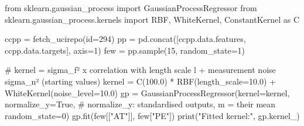 \documentclass[
  letterpaper,
  DIV=11,
  numbers=noendperiod]{scrreprt}
\newenvironment{Shaded}{\begin{snugshade}}{\end{snugshade}}
\newcommand{\BuiltInTok}[1]{\textcolor[rgb]{0.00,0.23,0.31}{#1}}
\newcommand{\CommentTok}[1]{\textcolor[rgb]{0.37,0.37,0.37}{#1}}
\newcommand{\DecValTok}[1]{\textcolor[rgb]{0.68,0.00,0.00}{#1}}
\newcommand{\FloatTok}[1]{\textcolor[rgb]{0.68,0.00,0.00}{#1}}
\newcommand{\ImportTok}[1]{\textcolor[rgb]{0.00,0.46,0.62}{#1}}
\newcommand{\NormalTok}[1]{\textcolor[rgb]{0.00,0.23,0.31}{#1}}
\newcommand{\OperatorTok}[1]{\textcolor[rgb]{0.37,0.37,0.37}{#1}}
\newcommand{\StringTok}[1]{\textcolor[rgb]{0.13,0.47,0.30}{#1}}
\newcommand{\VariableTok}[1]{\textcolor[rgb]{0.07,0.07,0.07}{#1}}
\begin{document}
\begin{Shaded}
\begin{Highlighting}[]
\ImportTok{from}\NormalTok{ sklearn.gaussian\_process }\ImportTok{import}\NormalTok{ GaussianProcessRegressor}
\ImportTok{from}\NormalTok{ sklearn.gaussian\_process.kernels }\ImportTok{import}\NormalTok{ RBF, WhiteKernel, ConstantKernel }\ImportTok{as}\NormalTok{ C}

\NormalTok{ccpp }\OperatorTok{=}\NormalTok{ fetch\_ucirepo(}\BuiltInTok{id}\OperatorTok{=}\DecValTok{294}\NormalTok{)}
\NormalTok{pp }\OperatorTok{=}\NormalTok{ pd.concat([ccpp.data.features, ccpp.data.targets], axis}\OperatorTok{=}\DecValTok{1}\NormalTok{)}
\NormalTok{few }\OperatorTok{=}\NormalTok{ pp.sample(}\DecValTok{15}\NormalTok{, random\_state}\OperatorTok{=}\DecValTok{1}\NormalTok{)}

\CommentTok{\# kernel = sigma\_f² x correlation with length scale l + measurement noise sigma\_n² (starting values)}
\NormalTok{kernel }\OperatorTok{=}\NormalTok{ C(}\FloatTok{100.0}\NormalTok{) }\OperatorTok{*}\NormalTok{ RBF(length\_scale}\OperatorTok{=}\FloatTok{10.0}\NormalTok{) }\OperatorTok{+}\NormalTok{ WhiteKernel(noise\_level}\OperatorTok{=}\FloatTok{10.0}\NormalTok{)}
\NormalTok{gp }\OperatorTok{=}\NormalTok{ GaussianProcessRegressor(kernel}\OperatorTok{=}\NormalTok{kernel, normalize\_y}\OperatorTok{=}\VariableTok{True}\NormalTok{,   }\CommentTok{\# normalize\_y: standardised outputs, m = their mean}
\NormalTok{                              random\_state}\OperatorTok{=}\DecValTok{0}\NormalTok{)}
\NormalTok{gp.fit(few[[}\StringTok{"AT"}\NormalTok{]], few[}\StringTok{"PE"}\NormalTok{])}
\BuiltInTok{print}\NormalTok{(}\StringTok{"Fitted kernel:"}\NormalTok{, gp.kernel\_)}


\end{Highlighting}
\end{Shaded}
\end{document}
